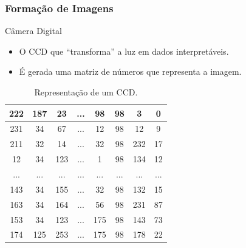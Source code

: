 \documentclass{beamer}
\begin{document}
\begin{frame}
\frametitle{Formação de Imagens}

	\begin{block}{Câmera Digital}
		\begin{itemize}
			\item O CCD que ``transforma'' a luz em dados interpretáveis.
			\item É gerada uma matriz de números que representa a imagem.
		\end{itemize}
	\end{block}


\begin{table}[thb]
\caption{\label{}Representação de um CCD.}
\scriptsize
\centering
\begin{tabular}{|c|c|c|c|c|c|c|c|}
\hline 
222 & 187 & 23 & ... & 98 & 98 & 3 & 0	 \\ 
\hline 
231 & 34 & 67 & ... & 12 & 98 & 12 & 9	 \\ 
\hline 
211 & 32 & 14 & ... & 32 & 98 & 232 & 17	 \\ 
\hline 
12 & 34 & 123 & ... & 1 & 98 & 134 & 12	 \\ 
\hline 
... & ... & ... & ... & ... & ... & ... & ...	 \\  
\hline 
143 & 34 & 155 & ... & 32 & 98 & 132 & 15	 \\  
\hline 
163 & 34 & 164 & ... & 56 & 98 & 231 & 87	 \\ 
\hline 
153 & 34 & 123 & ... & 175 & 98 & 143 & 73	 \\ 
\hline 
174 & 125 & 253 & ... & 175 & 98 & 178 & 22	 \\ 
\hline 
\end{tabular} 
\end{table}
\end{frame}


\end{document}
